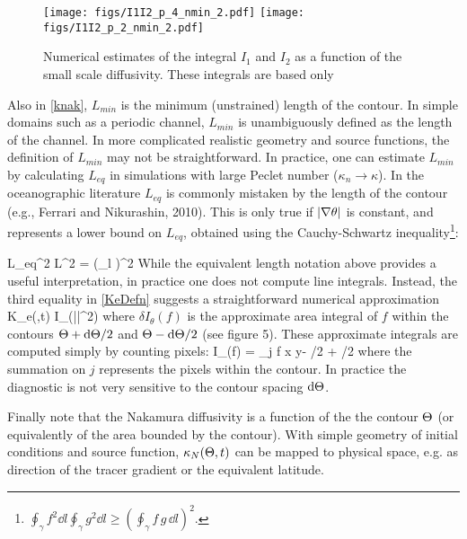 \documentclass[11pt]{article}
\newcommand{\kappaN}{\kappa_{n}}
\begin{document}
 \begin{figure}[ht]
    \centering
    \texttt{[image: figs/I1I2\_p\_4\_nmin\_2.pdf]}
     \texttt{[image: figs/I1I2\_p\_2\_nmin\_2.pdf]}
    \caption{\small Numerical estimates of the integral $I_1$ and $I_2$ as a function of the small scale
    			diffusivity. These integrals are based only}
        \label{SensitivitykNdTh}
\end{figure}

Also in \eqref{knak}, $L_{min}$ is the minimum  (unstrained) length of the contour. In simple domains such as a periodic channel,
 $L_{min}$ is unambiguously defined as the length of the channel. In more complicated realistic geometry and source functions, the definition of $L_{min}$ may not be straightforward. In practice, one can estimate $L_{min}$ by calculating $L_{eq}$ in simulations with large Peclet number ($\kappaN \to \kappa$). 
In the oceanographic literature  $L_{eq}$ is commonly mistaken by the length of the contour (e.g., Ferrari and Nikurashin, 2010). This is only true if $|\nabla \theta |$ is constant, and represents a lower bound on $L_{eq}$, obtained using the Cauchy-Schwartz inequality\footnote{$\oint_\gamma f^2 \dd l \oint_\gamma g^2 \dd l \ge \left(\oint_\gamma f\,g \,\dd l\right)^2.$}:

\beq
L_{eq}^2 \ge L^2 = \Big(\oint_\gamma \dd l \Big)^2\per
\eeq
While the equivalent length notation above provides a useful interpretation, in practice  one does not compute
line integrals. Instead, the third equality in \eqref{KeDefn} suggests a straightforward numerical approximation
\beq
K_e(\Th,t) \approx {} \delta I_\Th(\kappa |\nabla \vth|^2) \com 
\eeq
where $\delta I_\theta(f)$ is the approximate area integral of $f$ within the contours $\Theta + {\rm d} \Theta/2$ and $\Theta - {\rm d} \Theta/2$ (see figure 5). These approximate integrals are computed simply by counting pixels:
\beq
\delta I_\Th(f) = \sum_j f \dd x \dd y\com \qquad \Th - \dd \Th/2 \leq \vth \leq \Th + \dd \Th/2 \com
\eeq
 where the summation on $j$ represents the pixels within the contour. In practice the diagnostic is not very sensitive to the 
 contour spacing ${\rm d} \Theta$.
 
 Finally note that the Nakamura diffusivity is a function of the the contour $\Theta$ (or equivalently of the area bounded by the contour). With simple geometry of initial conditions and source function, $\kappa_N(\Theta,t)$  can be mapped to physical space, e.g. as direction of the tracer gradient or the equivalent latitude. 
  
\end{document}
